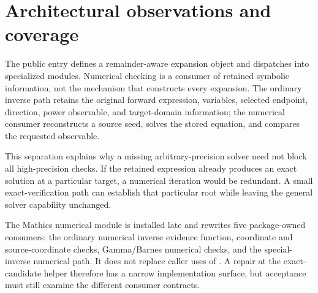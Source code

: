 \documentclass[11pt,letterpaper]{article}
\newcommand{\code}[1]{\texttt{\detokenize{#1}}}
\begin{document}
\section{Architectural observations and coverage}

The public entry defines a remainder-aware expansion object and dispatches into specialized modules. Numerical checking is a consumer of retained symbolic information, not the mechanism that constructs every expansion. The ordinary inverse path retains the original forward expression, variables, selected endpoint, direction, power observable, and target-domain information; the numerical consumer reconstructs a source seed, solves the stored equation, and compares the requested observable.\cite{core,numerical-checks}

This separation explains why a missing arbitrary-precision solver need not block all high-precision checks. If the retained expression already produces an exact solution at a particular target, a numerical iteration would be redundant. A small exact-verification path can establish that particular root while leaving the general solver capability unchanged.

The Mathics numerical module is installed late and rewrites five package-owned consumers: the ordinary numerical inverse evidence function, coordinate and source-coordinate checks, Gamma/Barnes numerical checks, and the special-inverse numerical path. It does not replace caller uses of \code{System`FindRoot}. A repair at the exact-candidate helper therefore has a narrow implementation surface, but acceptance must still examine the different consumer contracts.\cite{mathics-numeric}
\end{document}
